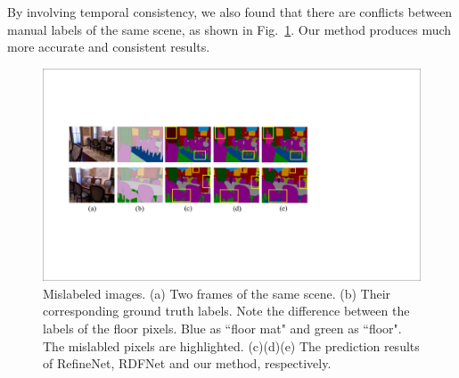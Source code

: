  By involving temporal consistency, we also found that there are conflicts between manual labels of the same scene, as shown in Fig.~\ref{fig:mislabels}. Our method produces much more accurate and consistent results.


\begin{figure}[!htbp]
	\setlength{\abovecaptionskip}{-0.2cm}
	\setlength{\belowcaptionskip}{-10cm}
	\centering
	\includegraphics[scale=0.4]{figure/Mislabels.pdf}
	\caption{Mislabeled images. (a) Two frames of the same scene. (b) Their corresponding ground truth labels. Note the difference between the labels of the floor pixels. Blue as ``floor mat" and green as ``floor".  The mislabled pixels are highlighted. (c)(d)(e) The prediction results of RefineNet, RDFNet and our method, respectively.}
	\label{fig:mislabels}
\end{figure}
%






